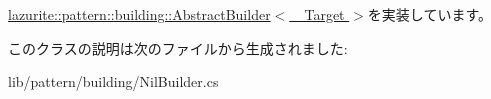 \hyperlink{classlazurite_1_1pattern_1_1building_1_1_abstract_builder_3_01___target_01_4_a4ddf3d66757e93e0a410708fff784801}{lazurite::pattern::building::AbstractBuilder$<$ \_\-Target $>$}を実装しています。

このクラスの説明は次のファイルから生成されました:\begin{DoxyCompactItemize}
\item 
lib/pattern/building/NilBuilder.cs\end{DoxyCompactItemize}
